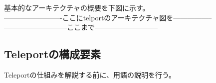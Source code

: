 \documentclass[12pt,a4paper,titlepage]{jreport}
\begin{document}
基本的なアーキテクチャの概要を下図に示す。
\\-------------------------ここにtelportのアーキテクチャ図を-----------------
\\---------------------------ここまで---------------------------\par




\subsection*{Teleportの構成要素}
Teleportの仕組みを解説する前に、用語の説明を行う。

    
\end{document}
